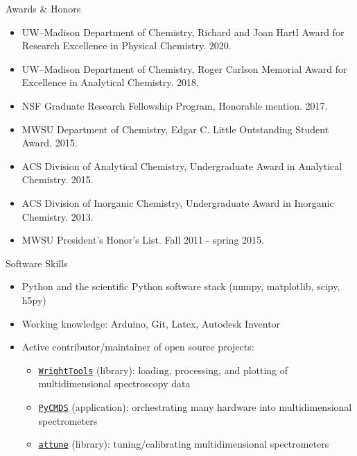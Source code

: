 \documentclass{resume} %
\begin{document}
\pagebreak
\begin{rSection}{Awards \& Honors}

\begin{itemize}[leftmargin = 0 pt]
	\item UW--Madison Department of Chemistry, Richard and Joan Hartl Award for Research Excellence in Physical Chemistry. 2020.
	\item UW--Madison Department of Chemistry, Roger Carlson Memorial Award for Excellence in Analytical Chemistry. 2018.
	\item NSF Graduate Research Fellowship Program, Honorable mention. 2017.
	\item MWSU Department of Chemistry, Edgar C. Little Outstanding Student Award. 2015.
	\item ACS Division of Analytical Chemistry, Undergraduate Award in Analytical Chemistry. 2015. 
	\item ACS Division of Inorganic Chemistry, Undergraduate Award in Inorganic Chemistry. 2013.
	\item MWSU President’s Honor’s List. Fall 2011 - spring 2015.
\end{itemize}

\end{rSection}


\begin{rSection}{Software Skills}
	\begin{itemize}[leftmargin = 0 pt]
		\item Python and the scientific Python software stack (numpy, matplotlib, scipy, h5py)
		\item Working knowledge: Arduino, Git, Latex, Autodesk Inventor
		\item Active contributor/maintainer of open source projects:
		\begin{itemize}
			\item \href{http://wright.tools}{\texttt{WrightTools}} (library): loading, processing, and plotting of multidimensional spectroscopy data 
			\item \href{http://github.com/wright-group/PyCMDS}{\texttt{PyCMDS}} (application): orchestrating many hardware into multidimensional spectrometers  
			\item \href{http://github.com/wright-group/attune}{\texttt{attune}} (library): tuning/calibrating multidimensional spectrometers
		\end{itemize}

	\end{itemize}	
\end{rSection}
\end{document}
